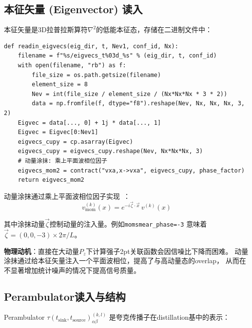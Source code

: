 \documentclass[12pt,a4paper]{ctexart}
\begin{document}
\subsection{本征矢量 (Eigenvector) 读入}

本征矢量是3D拉普拉斯算符$\nabla^2$的低能本征态，存储在二进制文件中：

\begin{codebox}
\begin{lstlisting}[style=pythonstyle]
def readin_eigvecs(eig_dir, t, Nev1, conf_id, Nx):
    filename = f"%s/eigvecs_t%03d_%s" % (eig_dir, t, conf_id)
    with open(filename, "rb") as f:
        file_size = os.path.getsize(filename)
        element_size = 8
        Nev = int(file_size / element_size / (Nx*Nx*Nx * 3 * 2))
        data = np.fromfile(f, dtype="f8").reshape(Nev, Nx, Nx, Nx, 3, 2)
    Eigvec = data[..., 0] + 1j * data[..., 1]
    Eigvec = Eigvec[0:Nev1]
    eigvecs_cupy = cp.asarray(Eigvec)
    eigvecs_cupy = eigvecs_cupy.reshape(Nev, Nx*Nx*Nx, 3)
    # 动量涂抹: 乘上平面波相位因子
    eigvecs_mom2 = contract("vxa,x->vxa", eigvecs_cupy, phase_factor)
    return eigvecs_mom2
\end{lstlisting}
\end{codebox}

\begin{physbox}
动量涂抹通过乘上平面波相位因子实现~\cite{Kinematically_enhanced,Bali_2016}：
\begin{equation}
    v_{\text{mom}}^{(k)}(x) = e^{-i\vec{\zeta}\cdot\vec{x}} \, v^{(k)}(x)
    \label{eq:momentum_smearing}
\end{equation}

其中涂抹动量$\vec{\zeta}$控制动量的注入量。例如\texttt{momsmear\_phase=-3}
意味着$\vec{\zeta} = (0, 0, -3) \times 2\pi/L$。

\textbf{物理动机}：直接在大动量$P_z$下计算强子2pt关联函数会因信噪比下降而困难。
动量涂抹通过给本征矢量注入一个平面波相位，提高了与高动量态的overlap，
从而在不显著增加统计噪声的情况下提高信号质量。
\end{physbox}

\subsection{Perambulator读入与结构}

Perambulator $\tau(t_{\text{sink}}, t_{\text{source}})_{\alpha\beta}^{(k,l)}$ 是夸克传播子在distillation基中的表示：
\end{document}
